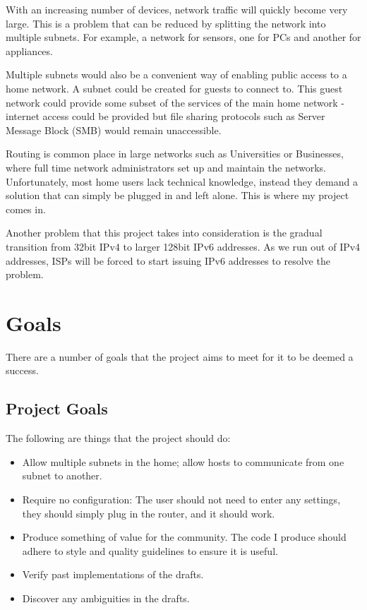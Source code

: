 \documentclass[12pt]{report}
\begin{document}
With an increasing number of devices, network traffic will quickly become very
large. This is a problem that can be reduced by splitting the network into
multiple subnets. For example, a network for sensors, one for PCs and another
for appliances. 

Multiple subnets would also be a convenient way of enabling public access to a
home network. A subnet could be created for guests to connect to. This guest
network could provide some subset of the services of the main home network -
internet access could be provided but file sharing protocols such as Server
Message Block (SMB)  would remain
unaccessible.

Routing is common place in large networks such as Universities or Businesses,
where full time network administrators set up and maintain the networks.
Unfortunately, most home users lack technical knowledge, instead they demand a
solution that can simply be plugged in and left alone. This is where my project
comes in. 

Another problem that this project takes into consideration is the gradual
transition from 32bit IPv4  to
larger 128bit IPv6   addresses.
As we run out of IPv4 addresses, ISPs   will be forced to start issuing IPv6 addresses to resolve the
problem.

\section{Goals}
There are a number of goals that the project aims to meet for it to be deemed
a success.

\subsection{Project Goals}
The following are things that the project should do:

\begin{itemize}
	\item Allow multiple subnets in the home; allow hosts to communicate
	from one subnet to another.
	\item Require no configuration: The user should not need to enter any 
	settings, they should simply plug in the router, and it should work.
	\item Produce something of value for the community. The code I produce  
	should adhere to style and quality guidelines to ensure it is useful.
	\item Verify past implementations of the drafts.
	\item Discover any ambiguities in the drafts.
\end{itemize}
\end{document}
